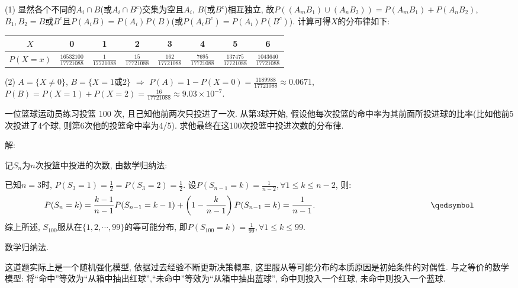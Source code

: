 \documentclass[standard]{ExBook}
\begin{document}
\begin{qitems}
\begin{bbox}
(1) 显然各个不同的$A_{i}\cap B$(或$A_{i}\cap B^{c}$)交集为空且$A_{i}$, $B$(或$B^c$)相互独立, 故$P((A_{m}B_{1})\cup(A_{n}B_{2}))=P(A_{m}B_{1})+P(A_{n}B_{2})$, $B_{1},B_{2}=B\text{或}B^c$且$P(A_{i}B)=P(A_{i})P(B)$(或$P(A_{i}B^{c})=P(A_{i})P(B^{c})$). 计算可得$X$的分布律如下:
\begin{center}
\begin{tabular}{c|c|c|c|c|c|c|c}
\hline
$X$ & 0 & 1 & 2 & 3 & 4 & 5 & 6 \\
\hline
$P(X=x)$ & $\frac{16532100}{17721088}$ & $\frac{1}{17721088}$ & $\frac{15}{17721088}$ & $\frac{162}{17721088}$ & $\frac{7695}{17721088}$ & $\frac{137475}{17721088}$ & $\frac{1043640}{17721088}$ \\
\hline
\end{tabular}
\end{center}
(2) $A=\{X \neq 0\}$, $B=\{X=1\text{或}2\}$ $\Longrightarrow$ $P(A)=1-P(X=0)=\frac{1189988}{17721088}\approx0.0671$, $P(B)=P(X=1)+P(X=2)=\frac{16}{17721088}\approx9.03\times10^{-7}$.
    \end{bbox}

\vspace{-5em}

    \begin{bbox}
    \begin{shaded}
        \qitem
一位篮球运动员练习投篮 100 次, 且己知他前两次只投进了一次. 从第3球开始, 假设他每次投篮的命中率为其前面所投进球的比率(比如他前5次投进了4个球, 则第6次他的投篮命中率为4/5). 求他最终在这100次投篮中投进次数的分布律.
    \end{shaded}
    \end{bbox}

\vspace{-5em}

    \begin{bbox}
解: 

记$S_n$为$n$次投篮中投进的次数, 由数学归纳法:

已知$n=3$时, $P(S_{3}=1)=\frac{1}{2}=P(S_{3}=2)=\frac{1}{2}$. 设$P(S_{n-1}=k)=\frac{1}{n-2},\forall1 \leq k \leq n-2$, 则: 
$$P(S_{n}=k)=\frac{k-1}{n-1}P(S_{n-1}=k-1)+\left(1-\frac{k}{n-1}\right)P(S_{n-1}=k)=\frac{1}{n-1}. \qquad\qquad\qquad\qquad\qquad\qquad\qquad\qedsymbol$$
综上所述, $S_{100}$服从在$\{1,2,\cdots,99\}$的等可能分布, 即$P(S_{100}=k)=\frac{1}{99},\forall1 \leq k \leq 99.$

\textcolor{themeColor}{\selectfont {} 数学归纳法.}

\textcolor{themeColor}{\selectfont {} 这道题实际上是一个随机强化模型, 依据过去经验不断更新决策概率, 这里服从等可能分布的本质原因是初始条件的对偶性. 与之等价的数学模型: 将``命中''等效为``从箱中抽出红球'',``未命中''等效为``从箱中抽出蓝球'', 命中则投入一个红球, 未命中则投入一个蓝球.}
    \end{bbox}


\end{qitems}
\end{document}
